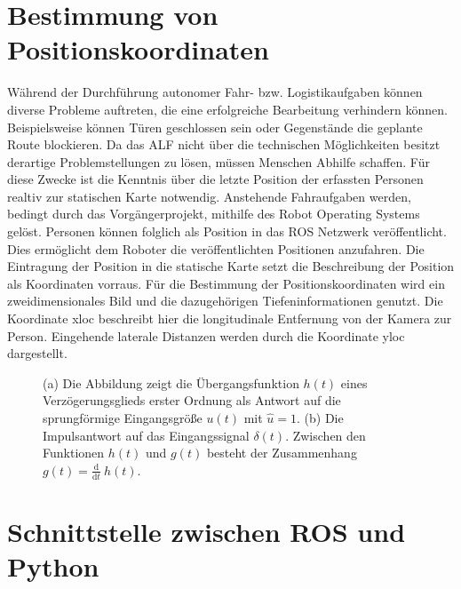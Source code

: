 	
		
		
	\section{Bestimmung von Positionskoordinaten}
		Während der Durchführung autonomer Fahr- bzw. Logistikaufgaben können diverse Probleme auftreten, die eine erfolgreiche Bearbeitung verhindern können. Beispielsweise können Türen geschlossen sein oder Gegenstände die geplante Route blockieren. Da das ALF nicht über die technischen Möglichkeiten besitzt derartige Problemstellungen zu lösen, müssen Menschen Abhilfe schaffen. Für diese Zwecke ist die Kenntnis über die letzte Position der erfassten Personen realtiv zur statischen Karte  notwendig. Anstehende Fahraufgaben werden, bedingt durch das Vorgängerprojekt, mithilfe des Robot Operating Systems gelöst. Personen können folglich als Position in das ROS Netzwerk veröffentlicht. Dies ermöglicht dem Roboter die veröffentlichten Positionen anzufahren. Die Eintragung der Position in die statische Karte setzt die Beschreibung der Position als Koordinaten vorraus. Für die Bestimmung der Positionskoordinaten wird ein zweidimensionales Bild und die dazugehörigen Tiefeninformationen genutzt. Die Koordinate xloc beschreibt hier die longitudinale Entfernung von der Kamera zur Person. Eingehende laterale Distanzen werden durch die Koordinate yloc dargestellt.
		
	\begin{figure}[H]
		\centering
		
		\caption{(a) Die Abbildung zeigt die Übergangsfunktion $h(t)$ eines Verzögerungsglieds erster Ordnung als Antwort auf die sprungförmige Eingangsgröße $u(t)$ mit $\hat{u}=1$. (b) Die Impulsantwort auf das Eingangssignal $\delta(t)$. Zwischen den Funktionen $h(t)$ und $g(t)$ besteht der Zusammenhang \mbox{$g(t)=\frac{\mathrm d}{\mathrm d t}\:h(t)$}.}
		\label{fig: antworten}
	\end{figure}

	\section{Schnittstelle zwischen ROS und Python}
	     
	

